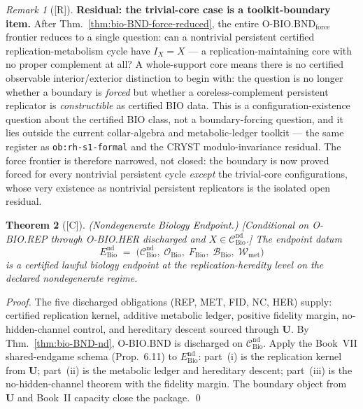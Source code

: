 \documentclass[12pt,oneside]{amsbook}
\theoremstyle{plain}
\newtheorem{theorem}{Theorem}[section]
\theoremstyle{definition}
\theoremstyle{remark}
\newtheorem{remark}[theorem]{Remark}
\newcommand{\status}[1]{\textup{[#1]}}
\begin{document}
\begin{remark}[\status{R}]\label{rem:bio-BND-trivial-core-residual}
\textbf{Residual: the trivial-core case is a toolkit-boundary item.}
After Thm.~\ref{thm:bio-BND-force-reduced}, the entire
O-BIO.BND$_{\mathrm{force}}$ frontier reduces to a single question:
can a nontrivial persistent certified replication-metabolism cycle
have $I_X = X$ --- a replication-maintaining core with no
proper complement at all?  A whole-support core means there is no
certified observable interior/exterior distinction to begin with:
the question is no longer whether a boundary is \emph{forced} but
whether a coreless-complement persistent replicator is
\emph{constructible} as certified BIO data.  This is a
configuration-existence question about the certified BIO class, not
a boundary-forcing question, and it lies outside the current
collar-algebra and metabolic-ledger toolkit --- the same register
as \texttt{ob:rh-s1-formal} and the CRYST modulo-invariance
residual.  The force frontier is therefore narrowed, not closed:
the boundary is now proved forced for every nontrivial persistent
cycle \emph{except} the trivial-core configurations, whose very
existence as nontrivial persistent replicators is the isolated open
residual.
\end{remark}

\begin{theorem}[\status{C}]\label{thm:bio-END-nd}
\textup{(Nondegenerate Biology Endpoint.)}
\textup{[Conditional on O-BIO.REP through O-BIO.HER discharged and
$X \in \mathcal{C}_{\mathrm{Bio}}^{\mathrm{nd}}$.]}
The endpoint datum
\[
 E_{\mathrm{Bio}}^{\mathrm{nd}} \;=\;
 \bigl(\mathcal{C}_{\mathrm{Bio}}^{\mathrm{nd}},\;
 \mathcal{O}_{\mathrm{Bio}},\;
 F_{\mathrm{Bio}},\;
 \mathcal{B}_{\mathrm{Bio}},\;
 \mathcal{W}_{\mathrm{met}}\bigr)
\]
is a certified lawful biology endpoint at the replication-heredity
level on the declared nondegenerate regime.
\end{theorem}

\begin{proof}
The five discharged obligations (REP, MET, FID, NC, HER) supply:
certified replication kernel, additive metabolic ledger, positive
fidelity margin, no-hidden-channel control, and hereditary descent
sourced through $\mathbf{U}$. By Thm.~\ref{thm:bio-BND-nd},
O-BIO.BND is discharged on $\mathcal{C}_{\mathrm{Bio}}^{\mathrm{nd}}$.
Apply the Book~VII shared-endgame schema (Prop.~6.11) to
$E_{\mathrm{Bio}}^{\mathrm{nd}}$: part~(i) is the replication kernel
from $\mathbf{U}$; part~(ii) is the metabolic ledger and hereditary
descent; part~(iii) is the no-hidden-channel theorem with the fidelity
margin. The boundary object from $\mathbf{U}$ and Book~II capacity
close the package.
\qed
\end{proof}
\end{document}
